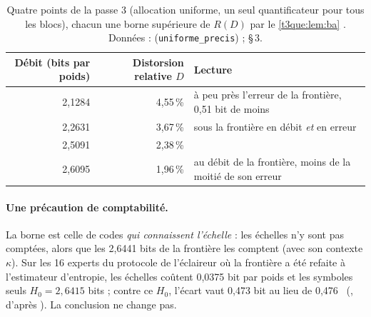 \begin{table}[tbp]
\centering\small
\begin{tabular}{r r l}
\toprule
Débit (bits par poids) & Distorsion relative $D$ & Lecture \\
\midrule
2,1284 & 4,55\,\% & à peu près l'erreur de la frontière, 0,51 bit de moins \\
2,2631 & 3,67\,\% & sous la frontière en débit \emph{et} en erreur \\
2,5091 & 2,38\,\% & \\
2,6095 & 1,96\,\% & au débit de la frontière, moins de la moitié de son erreur \\
\bottomrule
\end{tabular}
\caption[Quatre points de la borne distorsion-débit]{Quatre points de la passe 3 (allocation uniforme, un seul quantificateur pour tous les blocs), chacun une borne supérieure de $R(D)$ par le \cref{t3que:lem:ba} \mes. Données :  (\texttt{uniforme\_precis}) ;  §\,3.}
\label{t3que:tab:borne}
\end{table}

\paragraph{Une précaution de comptabilité.} La borne est celle de codes \emph{qui connaissent l'échelle} : les échelles n'y sont pas comptées, alors que les 2,6441 bits de la frontière les comptent (avec son contexte $\kappa$). Sur les 16 experts du protocole de l'éclaireur où la frontière a été refaite à l'estimateur d'entropie, les échelles coûtent 0,0375 bit par poids et les symboles seuls $H_0 = 2{,}6415$ bits ; contre ce $H_0$, l'écart vaut 0,473 bit au lieu de 0,476 \calc~(, d'après ). La conclusion ne change pas.

